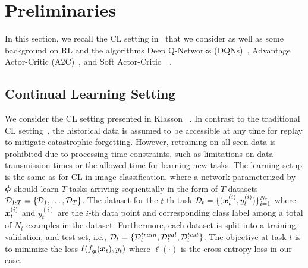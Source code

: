 
\section{Preliminaries}\label{paperD:sec:background}

In this section, we recall the CL setting in~ that we consider as well as some background on RL and the algorithms Deep Q-Networks (DQNs)~, Advantage Actor-Critic (A2C)~, and Soft Actor-Critic~~. 


\subsection{Continual Learning Setting}
We consider the CL setting presented in Klasson \etal~. In contrast to the traditional CL setting~, the historical data is assumed to be accessible at any time for replay to mitigate catastrophic forgetting. However, retraining on all seen data is prohibited due to processing time constraints, such as limitations on data transmission times or the allowed time for learning new tasks. The learning setup is the same as for CL in image classification, where a network parameterized by ${\bm{\phi}}$ should learn $T$ tasks arriving sequentially in the form of $T$ datasets ${\mathcal{D}}_{1:T} = \{{\mathcal{D}}_1, \dots, {\mathcal{D}}_T\}$. The dataset for the $t$-th task ${\mathcal{D}}_t = \{({\bm{x}}_t^{(i)}, y_t^{(i)})\}_{i=1}^{N_t}$ where ${\bm{x}}_t^{(i)}$ and $y_t^{(i)}$ are the $i$-th data point and corresponding class label among a total of $N_t$ examples in the dataset. Furthermore, each dataset is split into a training, validation, and test set, i.e., ${\mathcal{D}}_t = \{{\mathcal{D}}_t^{train}, {\mathcal{D}}_t^{val}, {\mathcal{D}}_t^{test}\}$. The objective at task $t$ is to minimize the loss $\ell(f_{{\bm{\phi}}}({\bm{x}}_t), y_{t})$ where $\ell(\cdot)$ is the cross-entropy loss in our case. 

